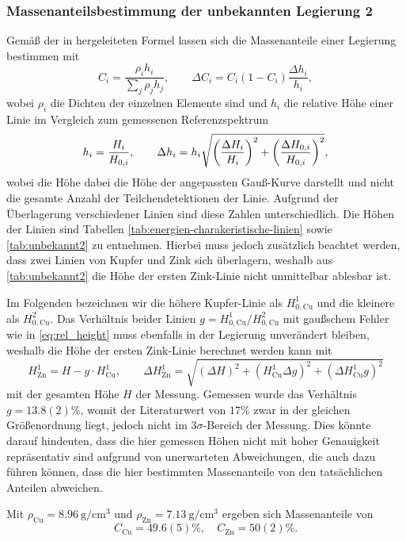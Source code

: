 \subsubsection*{Massenanteilsbestimmung der unbekannten Legierung 2}\label{subsubsec:massenanteile}
Gemäß der in \cite{skript} hergeleiteten Formel lassen sich die Massenanteile einer Legierung bestimmen mit 
\begin{equation}
    C_i = \frac{\rho_ih_i}{\sum_j\rho_j h_j}, \qquad \Delta C_i = C_i(1-C_i)\frac{\Delta h_i}{h_i},
\end{equation}
wobei $\rho_i$ die Dichten der einzelnen Elemente sind und $h_i$ die relative Höhe einer Linie 
im Vergleich zum gemessenen Referenzspektrum 
\begin{equation}
    h_i = \frac{H_i}{H_{0, i}},\qquad \Delta h_i = h_i\sqrt{\qty(\frac{\Delta H_i}{H_i})^2 + \qty(\frac{\Delta H_{0, i}}{H_{0, i}})^2},
    \label{eq:rel_height}
\end{equation}
wobei die Höhe dabei die Höhe der angepassten Gauß-Kurve darstellt 
und nicht die gesamte Anzahl der Teilchendetektionen der Linie. Aufgrund der Überlagerung verschiedener Linien 
sind diese Zahlen unterschiedlich. 
Die Höhen der Linien sind Tabellen \ref{tab:energien-charakeristische-linien} sowie \ref{tab:unbekannt2} zu entnehmen.
Hierbei muss jedoch zusätzlich beachtet werden, dass zwei Linien von Kupfer und Zink sich überlagern,
weshalb aus \cref{tab:unbekannt2} die Höhe der ersten Zink-Linie nicht unmittelbar ablesbar ist.\par 
Im Folgenden bezeichnen wir die höhere Kupfer-Linie als $H^1_{0, \mathrm{Cu}}$ und die kleinere als $H^2_{0, \mathrm{Cu}}$.
Das Verhältnis beider Linien $g = H^1_{0, \mathrm{Cu}} / H^2_{0, \mathrm{Cu}}$ mit gaußschem Fehler wie in \ref{eq:rel_height} muss ebenfalls 
in der Legierung unverändert bleiben, weshalb die Höhe der ersten Zink-Linie berechnet werden kann mit 
\begin{equation*}
    H^1_\mathrm{Zn} = H - g\cdot H^1_\mathrm{Cu}, \qquad 
    \Delta H^1_\mathrm{Zn} = \sqrt{(\Delta H)^2 + ( H^1_\mathrm{Cu}\Delta g)^2 + (\Delta  H^1_\mathrm{Cu} g)^2}
\end{equation*}
mit der gesamten Höhe $H$ der Messung. Gemessen wurde das Verhältnis $g=13.8(2)\%$, womit 
der Literaturwert \cite{xraydata} von $17\%$ zwar in der gleichen Größenordnung liegt, jedoch nicht im 
$3\sigma$-Bereich der Messung. Dies könnte darauf hindeuten, dass die hier gemessen Höhen 
nicht mit hoher Genauigkeit repräsentativ sind aufgrund von unerwarteten Abweichungen, die auch dazu führen können,
dass die hier bestimmten Massenanteile von den tatsächlichen Anteilen abweichen.\par
Mit $\rho_\mathrm{Cu} =\SI{8.96}{\gram\per\cubic\cm}$ und $\rho_\mathrm{Zn} =\SI{7.13}{\gram\per\cubic\cm}$ 
\cite{Workman:2022ynf} 
ergeben sich Massenanteile von 
\begin{equation}
    C_\mathrm{Cu} = 49.6(5)\%,\quad C_\mathrm{Zn} = 50(2)\%.
\end{equation}

